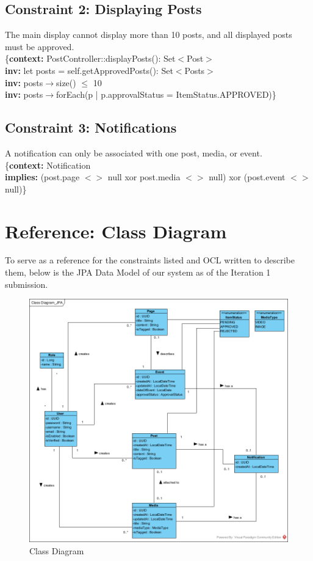 \documentclass{article}
\begin{document}
\subsection{Constraint 2: Displaying Posts}

The main display cannot display more than 10 posts, and all displayed posts must be approved. \\

\{\textbf{context:} PostController::displayPosts(): Set$<$Post$>$ \\
\textbf{inv:} let posts = self.getApprovedPosts(): Set$<$Posts$>$ \\
\textbf{inv:} posts$\rightarrow$size() $\leq$ 10 \\
\textbf{inv:} posts$\rightarrow$forEach(p | p.approvalStatus = ItemStatus.APPROVED)\} \\

\subsection{Constraint 3: Notifications}

A notification can only be associated with one post, media, or event. \\

\{\textbf{context:} Notification \\
\textbf{implies:} (post.page $<$$>$ null xor post.media $<$$>$ null) xor (post.event $<$$>$ null)\}  \\

\section{Reference: Class Diagram}

To serve as a reference for the constraints listed and OCL written to describe them, below is the JPA Data Model of our system as of the Iteration 1 submission.

\begin{figure}[H]
    \centering
    \includegraphics[width=.98\textwidth]{images/ClassDiagram.png}
    \centering
    \caption{Class Diagram}
\end{figure}
\end{document}
